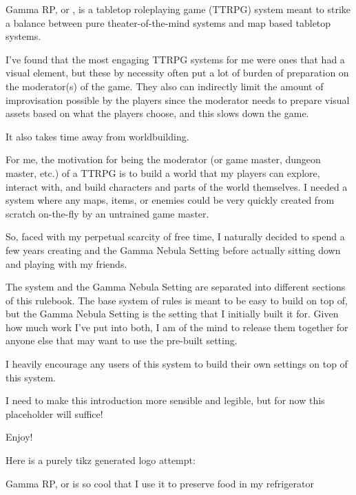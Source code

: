 
Gamma RP, or \GammaRP{}, is a tabletop roleplaying game (TTRPG) system meant to strike a balance between pure theater-of-the-mind systems and map based tabletop systems.

I've found that the most engaging TTRPG systems for me were ones that had a visual element, but these by necessity often put a lot of burden of preparation on the moderator(s) of the game. They also can indirectly limit the amount of improvisation possible by the players since the moderator needs to prepare visual assets based on what the players choose, and this slows down the game.

It also takes time away from worldbuilding.

For me, the motivation for being the moderator (or game master, dungeon master, etc.) of a TTRPG is to build a world that my players can explore, interact with, and build characters and parts of the world themselves. I needed a system where any maps, items, or enemies could be very quickly created from scratch on-the-fly by an untrained game master.

So, faced with my perpetual scarcity of free time, I naturally decided to spend a few years creating \GammaRP{} and the Gamma Nebula Setting before actually sitting down and playing with my friends.

The \GammaRP{} system and the Gamma Nebula Setting are separated into different sections of this rulebook. The base system of rules is meant to be easy to build on top of, but the Gamma Nebula Setting is the setting that I initially built it for. Given how much work I've put into both, I am of the mind to release them together for anyone else that may want to use the pre-built setting.

I heavily encourage any users of this system to build their own settings on top of this system.

I need to make this introduction more sensible and legible, but for now this placeholder will suffice!

Enjoy!

Here is a purely tikz generated logo attempt:

Gamma RP, or \GammaDodec{\GammaRP{}} is so cool that I use it to preserve food in my refrigerator

